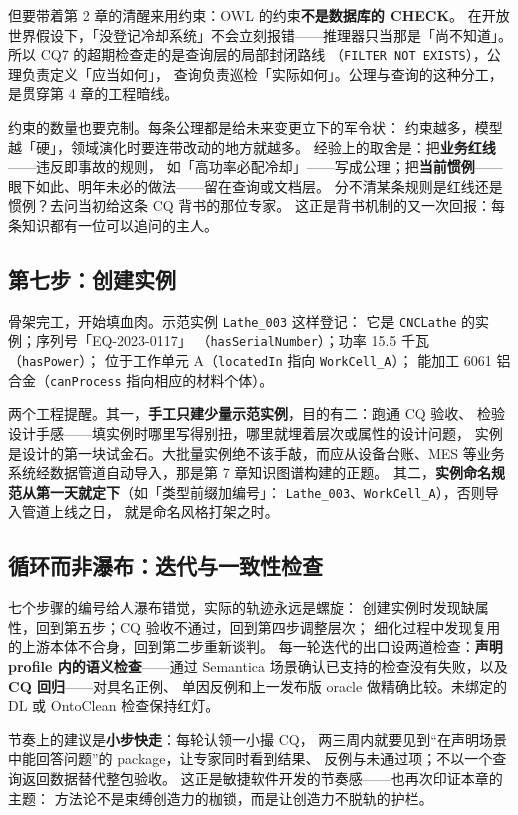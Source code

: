 但要带着第 2 章的清醒来用约束：OWL 的约束\textbf{不是数据库的 CHECK}。
在开放世界假设下，「没登记冷却系统」不会立刻报错——推理器只当那是「尚不知道」。
所以 CQ7 的超期检查走的是查询层的局部封闭路线
（\texttt{FILTER NOT EXISTS}），公理负责定义「应当如何」，
查询负责巡检「实际如何」。公理与查询的这种分工，是贯穿第 4 章的工程暗线。

约束的数量也要克制。每条公理都是给未来变更立下的军令状：
约束越多，模型越「硬」，领域演化时要连带改动的地方就越多。
经验上的取舍是：把\textbf{业务红线}——违反即事故的规则，
如「高功率必配冷却」——写成公理；把\textbf{当前惯例}——
眼下如此、明年未必的做法——留在查询或文档层。
分不清某条规则是红线还是惯例？去问当初给这条 CQ 背书的那位专家。
这正是背书机制的又一次回报：每条知识都有一位可以追问的主人。

\subsection{第七步：创建实例}

骨架完工，开始填血肉。示范实例 \texttt{Lathe\_003} 这样登记：
它是 \texttt{CNCLathe} 的实例；序列号「EQ-2023-0117」
（\texttt{hasSerialNumber}）；功率 15.5 千瓦（\texttt{hasPower}）；
位于工作单元 A（\texttt{locatedIn} 指向 \texttt{WorkCell\_A}）；
能加工 6061 铝合金（\texttt{canProcess} 指向相应的材料个体）。

两个工程提醒。其一，\textbf{手工只建少量示范实例}，目的有二：跑通 CQ 验收、
检验设计手感——填实例时哪里写得别扭，哪里就埋着层次或属性的设计问题，
实例是设计的第一块试金石。大批量实例绝不该手敲，而应从设备台账、MES
等业务系统经数据管道自动导入，那是第 7 章知识图谱构建的正题。
其二，\textbf{实例命名规范从第一天就定下}（如「类型前缀加编号」：
\texttt{Lathe\_003}、\texttt{WorkCell\_A}），否则导入管道上线之日，
就是命名风格打架之时。

\subsection{循环而非瀑布：迭代与一致性检查}

七个步骤的编号给人瀑布错觉，实际的轨迹永远是螺旋：
创建实例时发现缺属性，回到第五步；CQ 验收不通过，回到第四步调整层次；
细化过程中发现复用的上游本体不合身，回到第二步重新谈判。
每一轮迭代的出口设两道检查：\textbf{声明 profile 内的语义检查}——通过
Semantica 场景确认已支持的检查没有失败，以及 \textbf{CQ 回归}——对具名正例、
单因反例和上一发布版 oracle 做精确比较。未绑定的 DL 或 OntoClean 检查保持红灯。

节奏上的建议是\textbf{小步快走}：每轮认领一小撮 CQ，
两三周内就要见到“在声明场景中能回答问题”的 package，让专家同时看到结果、
反例与未通过项；不以一个查询返回数据替代整包验收。
这正是敏捷软件开发的节奏感——也再次印证本章的主题：
方法论不是束缚创造力的枷锁，而是让创造力不脱轨的护栏。

